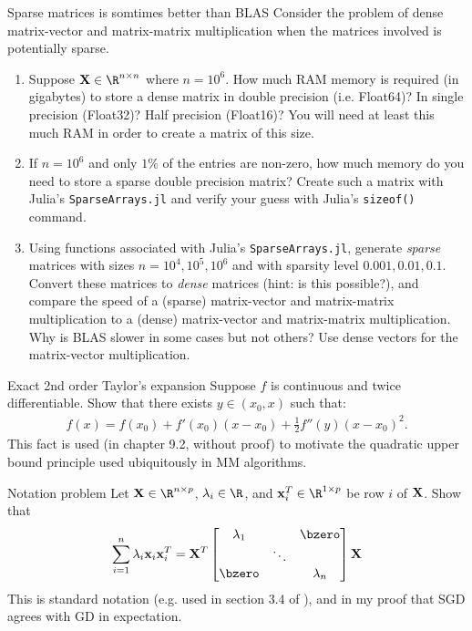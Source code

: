 \documentclass[./some_latex_template.tex]{subfiles}
\begin{document}
\begin{problembox}{Sparse matrices is somtimes better than BLAS}{}
Consider the problem of dense matrix-vector and matrix-matrix multiplication when the matrices involved is potentially sparse. 
\begin{enumerate}
	\item Suppose $\bX \in \R^{n \times n}$ where $n = 10^6$. How much RAM  memory is required (in gigabytes) to store a dense matrix in double precision (i.e. Float64)? In single precision (Float32)? Half precision (Float16)? You will need at least this much RAM in order to create a matrix of this size. 
	\item If $n = 10^6$ and only $1\%$ of the entries are non-zero, how much memory do you need to store a sparse double precision matrix? Create such a matrix with Julia's \texttt{SparseArrays.jl} and verify your guess with Julia's \texttt{sizeof()} command. 
	\item Using functions associated with Julia's \texttt{SparseArrays.jl}, generate \textit{sparse} matrices with sizes $n = 10^4, 10^5, 10^6$ and with sparsity level $0.001, 0.01, 0.1$. Convert these matrices to \textit{dense} matrices (hint: is this possible?), and compare the speed of a (sparse) matrix-vector and matrix-matrix multiplication to a (dense) matrix-vector and matrix-matrix multiplication. Why is BLAS slower in some cases but not others? Use dense vectors for the matrix-vector multiplication. 
\end{enumerate}
\end{problembox}

\begin{problembox}{Exact 2nd order Taylor's expansion}{}
Suppose $f$ is continuous and twice differentiable. Show that there exists $y \in (x_0, x)$ such that:
\begin{align*}
f(x) = f(x_0) + f'(x_0)(x - x_0) + \frac{1}{2} f''(y)(x - x_0)^2.
\end{align*}
This fact is used (in chapter 9.2, without proof) to motivate the quadratic upper bound principle used ubiquitously in MM algorithms. 
\end{problembox}

\begin{problembox}{Notation problem}{}
Let $\bX \in \R^{n \times p}$, $\lambda_i \in \R$, and $\bx_i^T \in \R^{1 \times p}$ be row $i$ of $\mathbf{X}$. Show that
\begin{align*}
	\sum_{i=1}^n \lambda_i \bx_i\bx_i^T = \bX^T
	\begin{bmatrix}
		\lambda_1 & & \bzero \\
		& \ddots & \\
		\bzero & & \lambda_n
	\end{bmatrix} \bX
\end{align*}
This is standard notation (e.g. used in section 3.4 of \cite{dobson2008introduction}), and in my proof that SGD agrees with GD in expectation. 
\end{problembox}
\end{document}
